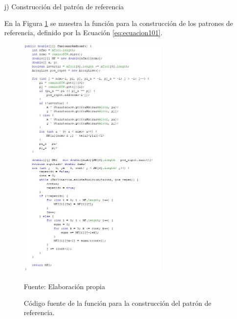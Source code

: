 \begin{enumerate}
\item[j)]Construcción del patrón de referencia
\par
En la Figura \ref{fig:figura3.34} se muestra la función para la construcción de los patrones de referencia, definido por la Ecuación \eqref{eq:ecuacion101}.
\begin{figure}[H]
\captionsetup{justification=centering}
\begin{center}
\includegraphics[width=0.7\textwidth]{Imagenes/Cap3/image034}
\end{center}
\begin{center}
\vskip -0.5cm
\caption{\small{Código fuente de la función para la construcción del patrón de referencia.}}
\label{fig:figura3.34}
{\small{Fuente: Elaboración propia}}
\end{center}
\end{figure}
\end{enumerate}

\newpage

